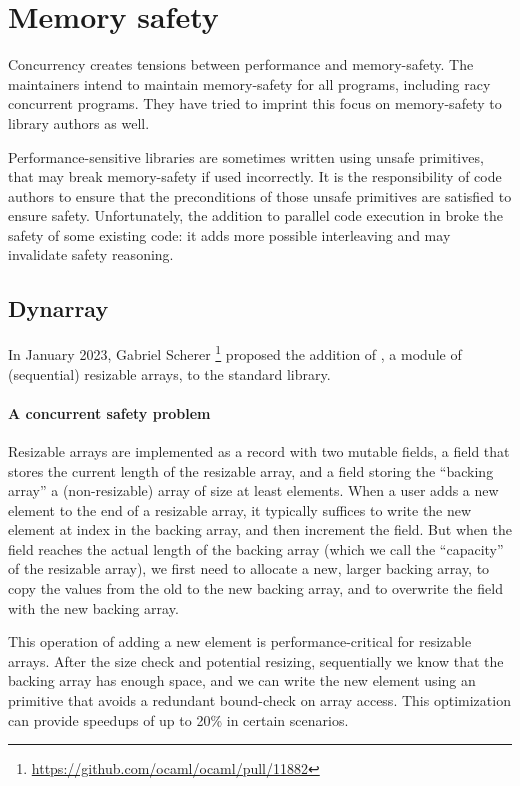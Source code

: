 \section{Memory safety}

Concurrency creates tensions between performance and memory-safety. The \OCaml maintainers intend to maintain memory-safety for all \OCaml programs, including racy concurrent programs. They have tried to imprint this focus on memory-safety to library authors as well.

Performance-sensitive \OCaml libraries are sometimes written using unsafe primitives, that may break memory-safety if used incorrectly. It is the responsibility of code authors to ensure that the preconditions of those unsafe primitives are satisfied to ensure safety. Unfortunately, the addition to parallel code execution in \OCamlFive broke the safety of some existing code: it adds more possible interleaving and may invalidate safety reasoning.

\subsection{Dynarray} In January 2023, Gabriel Scherer%
\footnote{
\url{https://github.com/ocaml/ocaml/pull/11882}
}
proposed the addition of , a module of (sequential) resizable arrays, to the \OCaml standard library.

\paragraph{A concurrent safety problem}

Resizable arrays are implemented as a record with two mutable fields, a  field that stores the current length of the resizable array, and a  field storing the ``backing array'' a (non-resizable) array of size at least  elements. When a user adds a new element to the end of a resizable array, it typically suffices to write the new element at index  in the backing array, and then increment the  field. But when the  field reaches the actual length of the backing array (which we call the ``capacity'' of the resizable array), we first need to allocate a new, larger backing array, to copy the values from the old to the new backing array, and to overwrite the  field with the new backing array.

This operation of adding a new element is performance-critical for resizable arrays. After the size check and potential resizing, sequentially we know that the backing array has enough space, and we can write the new element using an  primitive that avoids a redundant bound-check on array access. This optimization can provide speedups of up to 20\% in certain scenarios.

